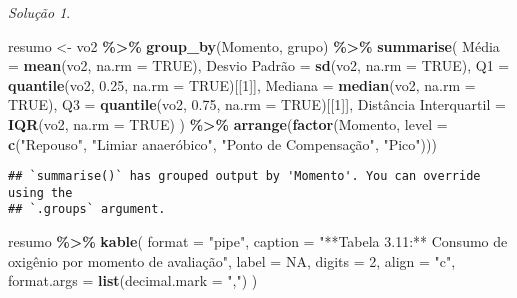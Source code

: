 \documentclass[
]{latex/krantz}
\newenvironment{Shaded}{\begin{snugshade}}{\end{snugshade}}
\newcommand{\AttributeTok}[1]{\textcolor[rgb]{0.13,0.29,0.53}{#1}}
\newcommand{\ConstantTok}[1]{\textcolor[rgb]{0.56,0.35,0.01}{#1}}
\newcommand{\DecValTok}[1]{\textcolor[rgb]{0.00,0.00,0.81}{#1}}
\newcommand{\FloatTok}[1]{\textcolor[rgb]{0.00,0.00,0.81}{#1}}
\newcommand{\FunctionTok}[1]{\textcolor[rgb]{0.13,0.29,0.53}{\textbf{#1}}}
\newcommand{\NormalTok}[1]{#1}
\newcommand{\OtherTok}[1]{\textcolor[rgb]{0.56,0.35,0.01}{#1}}
\newcommand{\SpecialCharTok}[1]{\textcolor[rgb]{0.81,0.36,0.00}{\textbf{#1}}}
\newcommand{\StringTok}[1]{\textcolor[rgb]{0.31,0.60,0.02}{#1}}
\theoremstyle{definition}
\theoremstyle{definition}
\theoremstyle{definition}
\theoremstyle{definition}
\theoremstyle{remark}
\newtheorem*{solution}{Solução}
\begin{document}
\begin{solution}
\begin{Shaded}
\begin{Highlighting}[]
\NormalTok{resumo }\OtherTok{\textless{}{-}}\NormalTok{ vo2 }\SpecialCharTok{\%\textgreater{}\%}
            \FunctionTok{group\_by}\NormalTok{(Momento, grupo) }\SpecialCharTok{\%\textgreater{}\%}
            \FunctionTok{summarise}\NormalTok{(}
              \StringTok{\textasciigrave{}}\AttributeTok{Média}\StringTok{\textasciigrave{}} \OtherTok{=} \FunctionTok{mean}\NormalTok{(vo2, }\AttributeTok{na.rm =} \ConstantTok{TRUE}\NormalTok{),}
              \StringTok{\textasciigrave{}}\AttributeTok{Desvio Padrão}\StringTok{\textasciigrave{}} \OtherTok{=} \FunctionTok{sd}\NormalTok{(vo2, }\AttributeTok{na.rm =} \ConstantTok{TRUE}\NormalTok{),}
              \AttributeTok{Q1 =} \FunctionTok{quantile}\NormalTok{(vo2, }\FloatTok{0.25}\NormalTok{, }\AttributeTok{na.rm =} \ConstantTok{TRUE}\NormalTok{)[[}\DecValTok{1}\NormalTok{]],}
              \StringTok{\textasciigrave{}}\AttributeTok{Mediana}\StringTok{\textasciigrave{}} \OtherTok{=} \FunctionTok{median}\NormalTok{(vo2, }\AttributeTok{na.rm =} \ConstantTok{TRUE}\NormalTok{),}
              \AttributeTok{Q3 =} \FunctionTok{quantile}\NormalTok{(vo2, }\FloatTok{0.75}\NormalTok{, }\AttributeTok{na.rm =} \ConstantTok{TRUE}\NormalTok{)[[}\DecValTok{1}\NormalTok{]],}
              \StringTok{\textasciigrave{}}\AttributeTok{Distância Interquartil}\StringTok{\textasciigrave{}} \OtherTok{=} \FunctionTok{IQR}\NormalTok{(vo2, }\AttributeTok{na.rm =} \ConstantTok{TRUE}\NormalTok{)}
\NormalTok{            ) }\SpecialCharTok{\%\textgreater{}\%}
            \FunctionTok{arrange}\NormalTok{(}\FunctionTok{factor}\NormalTok{(Momento, }\AttributeTok{level =} \FunctionTok{c}\NormalTok{(}\StringTok{"Repouso"}\NormalTok{, }\StringTok{"Limiar anaeróbico"}\NormalTok{, }\StringTok{"Ponto de Compensação"}\NormalTok{, }\StringTok{"Pico"}\NormalTok{)))}
\end{Highlighting}
\end{Shaded}

\begin{verbatim}
## `summarise()` has grouped output by 'Momento'. You can override using the
## `.groups` argument.
\end{verbatim}

\begin{Shaded}
\begin{Highlighting}[]
\NormalTok{resumo }\SpecialCharTok{\%\textgreater{}\%}
  \FunctionTok{kable}\NormalTok{(}
    \AttributeTok{format =} \StringTok{"pipe"}\NormalTok{,}
    \AttributeTok{caption =} \StringTok{"**Tabela 3.11:** Consumo de oxigênio por momento de avaliação"}\NormalTok{,}
    \AttributeTok{label =} \ConstantTok{NA}\NormalTok{,}
    \AttributeTok{digits =} \DecValTok{2}\NormalTok{,}
    \AttributeTok{align =} \StringTok{"c"}\NormalTok{,}
    \AttributeTok{format.args =} \FunctionTok{list}\NormalTok{(}\AttributeTok{decimal.mark =} \StringTok{","}\NormalTok{)}
\NormalTok{  )}
\end{Highlighting}
\end{Shaded}


\end{solution}
\end{document}
